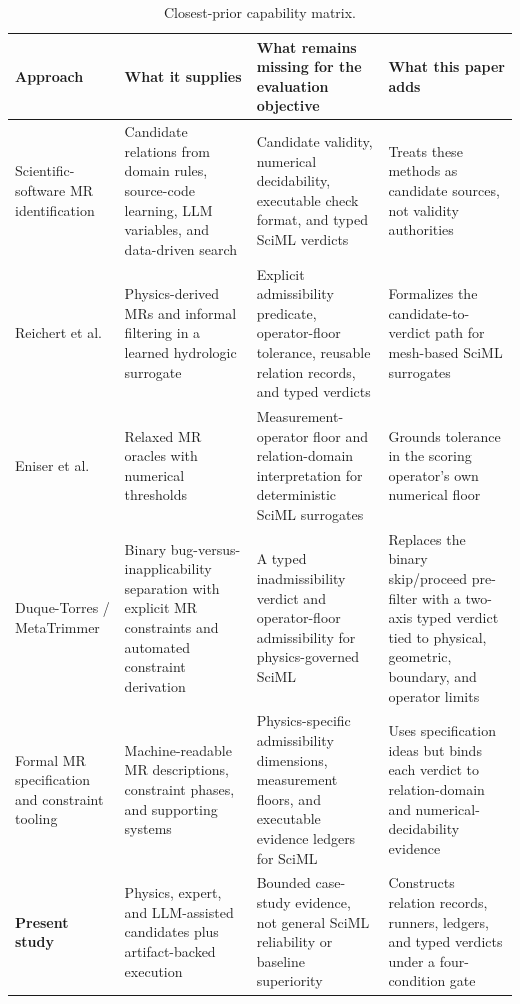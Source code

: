 \documentclass[preprint,12pt]{elsarticle}
\begin{document}
\begin{table}[H]
\centering\footnotesize
\caption{Closest-prior capability matrix.}
\label{tab:closest-prior-positioning-supp}
\renewcommand{\arraystretch}{0.82}
\begin{tabularx}{\textwidth}{@{}>{\raggedright\arraybackslash}p{}YYY@{}}
\toprule
Approach & What it supplies & What remains missing for the evaluation objective & What this paper adds \\
\midrule
Scientific-software MR identification & Candidate relations from domain rules, source-code learning, LLM variables, and data-driven search & Candidate validity, numerical decidability, executable check format, and typed SciML verdicts & Treats these methods as candidate sources, not validity authorities \\
Reichert et al. & Physics-derived MRs and informal filtering in a learned hydrologic surrogate & Explicit admissibility predicate, operator-floor tolerance, reusable relation records, and typed verdicts & Formalizes the candidate-to-verdict path for mesh-based SciML surrogates \\
Eniser et al. & Relaxed MR oracles with numerical thresholds & Measurement-operator floor and relation-domain interpretation for deterministic SciML surrogates & Grounds tolerance in the scoring operator's own numerical floor \\
Duque-Torres / MetaTrimmer & Binary bug-versus-inapplicability separation with explicit MR constraints and automated constraint derivation & A typed inadmissibility verdict and operator-floor admissibility for physics-governed SciML & Replaces the binary skip/proceed pre-filter with a two-axis typed verdict tied to physical, geometric, boundary, and operator limits \\
Formal MR specification and constraint tooling & Machine-readable MR descriptions, constraint phases, and supporting systems & Physics-specific admissibility dimensions, measurement floors, and executable evidence ledgers for SciML & Uses specification ideas but binds each verdict to relation-domain and numerical-decidability evidence \\
\textbf{Present study} & Physics, expert, and LLM-assisted candidates plus artifact-backed execution & Bounded case-study evidence, not general SciML reliability or baseline superiority & Constructs relation records, runners, ledgers, and typed verdicts under a four-condition gate \\
\bottomrule
\end{tabularx}
\end{table}
\end{document}
